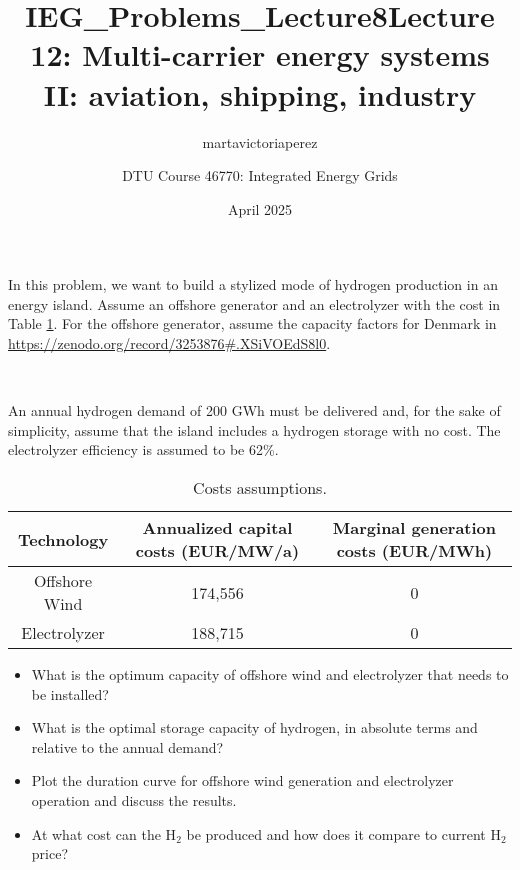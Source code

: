 \documentclass[10pt]{article}
\title{IEG_Problems_Lecture8}
\author{martavictoriaperez }
\date{April 2025}
\newenvironment{problem}[2][Problem]{\begin{trivlist}
\item[\hskip \labelsep {\bfseries #1}\hskip \labelsep {\bfseries #2.}]}{\end{trivlist}}
\begin{document}
 
\title{\textbf{Lecture 12: Multi-carrier energy systems II: aviation, shipping, industry}}
\author{DTU Course 46770: Integrated Energy Grids }
\maketitle

\begin{problem}{12.1}

In this problem, we want to build a stylized mode of hydrogen production in an energy island. Assume an offshore generator and an electrolyzer with the cost in Table \ref{tab:my_label}. For the offshore generator, assume the capacity factors for Denmark in \url{https://zenodo.org/record/3253876#.XSiVOEdS8l0}.

\

An annual hydrogen demand of 200 GWh must be delivered and, for the sake of simplicity, assume that the island includes a hydrogen storage with no cost. The electrolyzer efficiency is assumed to be 62\%.



\begin{table}[h]
    \centering
    \begin{tabular}{ccc}
    \hline
        Technology & Annualized capital costs (EUR/MW/a) & Marginal generation costs (EUR/MWh) \\
    \hline
    Offshore Wind &  174,556 & 0 \\
         Electrolyzer & 188,715 & 0 \\
    \hline
    \end{tabular}
    \caption{Costs assumptions.}
    \label{tab:my_label}
\end{table}

\begin{itemize}
\item[a)] What is the optimum capacity of offshore wind and electrolyzer that needs to be installed?

\item[b)] What is the optimal storage capacity of hydrogen, in absolute terms and relative to the annual demand?

\item[c)] Plot the duration curve for offshore wind generation and electrolyzer operation and discuss the results.

\item[d)] At what cost can the H$_2$ be produced and how does it compare to current H$_2$ price?

\end{itemize}


\end{problem}
\end{document}
